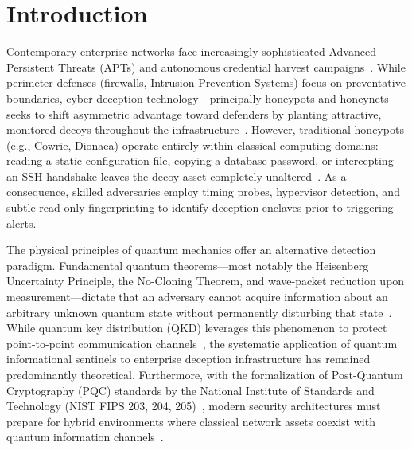 \documentclass[pdflatex,sn-mathphys-num]{sn-jnl}
\theoremstyle{thmstyleone}
\theoremstyle{thmstyletwo}
\theoremstyle{thmstylethree}
\begin{document}

\maketitle

\section{Introduction}\label{sec:intro}

Contemporary enterprise networks face increasingly sophisticated Advanced Persistent Threats (APTs) and autonomous credential harvest campaigns~\cite{wang2024quantum}. While perimeter defenses (firewalls, Intrusion Prevention Systems) focus on preventative boundaries, cyber deception technology---principally honeypots and honeynets---seeks to shift asymmetric advantage toward defenders by planting attractive, monitored decoys throughout the infrastructure~\cite{gupta2024canary}. However, traditional honeypots (e.g., Cowrie, Dionaea) operate entirely within classical computing domains: reading a static configuration file, copying a database password, or intercepting an SSH handshake leaves the decoy asset completely unaltered~\cite{zhao2024adversarial}. As a consequence, skilled adversaries employ timing probes, hypervisor detection, and subtle read-only fingerprinting to identify deception enclaves prior to triggering alerts.

The physical principles of quantum mechanics offer an alternative detection paradigm. Fundamental quantum theorems---most notably the Heisenberg Uncertainty Principle, the No-Cloning Theorem, and wave-packet reduction upon measurement---dictate that an adversary cannot acquire information about an arbitrary unknown quantum state without permanently disturbing that state~\cite{alvarez2024quantum}. While quantum key distribution (QKD) leverages this phenomenon to protect point-to-point communication channels~\cite{zhang2024physical,mora2024qkd}, the systematic application of quantum informational sentinels to enterprise deception infrastructure has remained predominantly theoretical. Furthermore, with the formalization of Post-Quantum Cryptography (PQC) standards by the National Institute of Standards and Technology (NIST FIPS 203, 204, 205)~\cite{nist2024pqc}, modern security architectures must prepare for hybrid environments where classical network assets coexist with quantum information channels~\cite{singh2024postquantum}.
\end{document}
